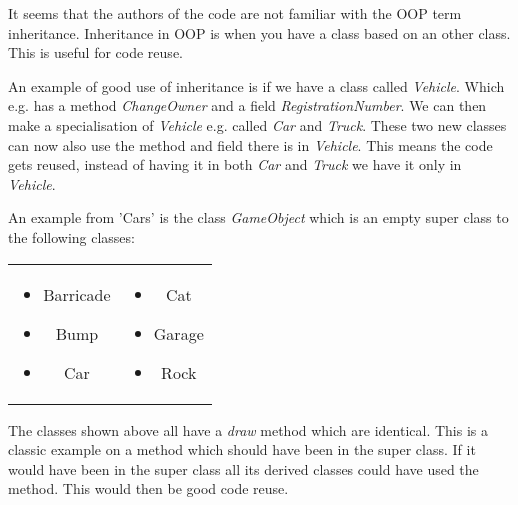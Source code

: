 It seems that the authors of the code are not familiar with the OOP term inheritance.
Inheritance in OOP is when you have a class based on an other class.
This is useful for code reuse.

An example of good use of inheritance is if we have a class called \textit{Vehicle}.
Which e.g. has a method \textit{ChangeOwner} and a field \textit{RegistrationNumber}.
We can then make a specialisation of \textit{Vehicle} e.g. called \textit{Car} and \textit{Truck}.
These two new classes can now also use the method and field there is in \textit{Vehicle}.
This means the code gets reused, instead of having it in both \textit{Car} and \textit{Truck} we have it only in \textit{Vehicle}.

An example from 'Cars' is the class \textit{GameObject} which is an empty super class to the following classes:

\begin{tabular}{ c  c }
\parbox{\textwidth/2}{
\begin{itemize}
\item Barricade
\item Bump
\item Car
\end{itemize}} &
\parbox{\textwidth/2}{
\begin{itemize}
\item Cat
\item Garage
\item Rock
\end{itemize}
}
\end{tabular}
The classes shown above all have a \textit{draw} method which are identical.
This is a classic example on a method which should have been in the super class.
If it would have been in the super class all its derived classes could have used the method.
This would then be good code reuse.